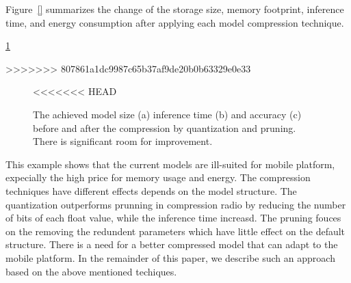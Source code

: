 Figure~\ref{} summarizes the change of the storage size, memory footprint, inference time, and energy consumption after applying each model
compression technique.

\ref{fig:motivation}

>>>>>>> 807861a1dc9987c65b37af9de20b0b63329e0e33
\begin{figure}[!t]
\centering
{}
\hfill
{}
\hfill
<<<<<<< HEAD
\caption{The achieved model size (a) inference time (b) and accuracy (c) before and after the compression by quantization and pruning.
There is significant room for improvement.} 
\label{fig:motivation}
\end{figure}

This example shows that the current models are ill-suited for mobile platform,
expecially the high price for memory usage and energy.
The compression techniques have different effects depends on the model 
structure.
The quantization outperforms prunning in compression radio by
reducing the number of bits of each float value, while the inference time increasd.
The pruning fouces on the removing the redundent parameters which have little effect 
on the default structure.
There is a need for a better compressed
model that can adapt to the mobile platform. In the remainder of this
paper, we describe such an approach based on the above mentioned techiques.



